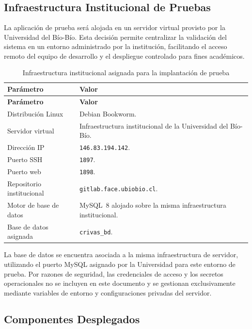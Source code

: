 \subsection{Infraestructura Institucional de Pruebas}

La aplicación de prueba será alojada en un servidor virtual provisto por la Universidad del Bío-Bío. Esta decisión permite centralizar la validación del sistema en un entorno administrado por la institución, facilitando el acceso remoto del equipo de desarrollo y el despliegue controlado para fines académicos.

\begin{longtable}{|p{}|p{}|}
\caption{Infraestructura institucional asignada para la implantación de prueba}\label{tab:infraestructura-ubb}\\
\hline
\textbf{Parámetro} & \textbf{Valor} \\
\hline
\endfirsthead
\hline
\textbf{Parámetro} & \textbf{Valor} \\
\hline
\endhead
\hline
\endfoot

Distribución Linux & Debian Bookworm. \\
\hline
Servidor virtual & Infraestructura institucional de la Universidad del Bío-Bío. \\
\hline
Dirección IP & \texttt{146.83.194.142}. \\
\hline
Puerto SSH & \texttt{1897}. \\
\hline
Puerto web & \texttt{1898}. \\
\hline
Repositorio institucional & \texttt{gitlab.face.ubiobio.cl}. \\
\hline
Motor de base de datos & MySQL~8 alojado sobre la misma infraestructura institucional. \\
\hline
Base de datos asignada & \texttt{crivas\_bd}. \\

\end{longtable}

La base de datos se encuentra asociada a la misma infraestructura de servidor, utilizando el puerto MySQL asignado por la Universidad para este entorno de prueba. Por razones de seguridad, las credenciales de acceso y los secretos operacionales no se incluyen en este documento y se gestionan exclusivamente mediante variables de entorno y configuraciones privadas del servidor.

\subsection{Componentes Desplegados}

